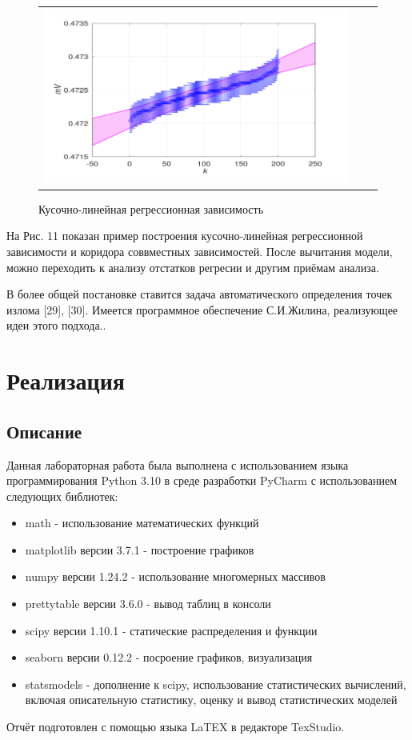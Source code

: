 \documentclass[a4paper,14pt]{article}
\begin{document}
	\begin{figure}[H]
		\begin{center}
			\begin{tabular}{ccc}
				\includegraphics[scale=0.8]{../image/problem10.png}
			\end{tabular}
		\end{center}
		\caption{ Кусочно-линейная регрессионная зависимость} 
	\end{figure}
	
	На Рис. 11 показан пример построения кусочно-линейная регрессионной зависимости и коридора соввместных зависимостей. После вычитания модели, можно переходить к анализу отстатков регресии и другим приёмам анализа.
	
	В более общей постановке ставится задача автоматического определения точек излома [29], [30]. Имеется программное обеспечение
	С.И.Жилина, реализующее идеи этого подхода..
	\section{Реализация}
	\subsection{Описание}
	Данная лабораторная работа была выполнена с использованием языка
	программирования Python 3.10 в среде разработки PyCharm с
	использованием следующих библиотек:
	\begin{itemize}
		\item math - использование математических функций
		\item matplotlib версии 3.7.1 - построение графиков
		\item numpy версии 1.24.2 - использование многомерных массивов
		\item prettytable версии 3.6.0 - вывод таблиц в консоли 
		\item scipy версии 1.10.1 - статические распределения и функции
		\item seaborn версии 0.12.2 - посроение графиков, визуализация
		\item statsmodels - дополнение к scipy, использование статистических вычислений, включая описательную статистику, оценку и вывод статистических моделей
	\end{itemize}
	Отчёт подготовлен с помощью языка LaTEX в редакторе TexStudio.
\end{document}
